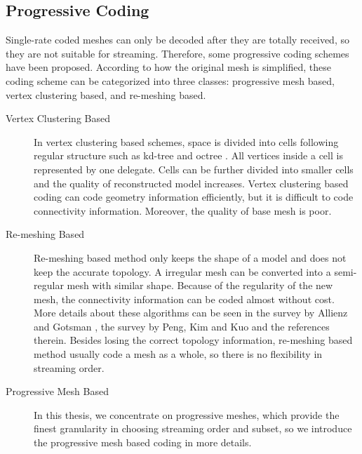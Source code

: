 \documentclass[11pt, a4paper]{report}
\begin{document}
    \subsection{Progressive Coding}
    Single-rate coded meshes can only be decoded after they are
    totally received, so they are not suitable for streaming. Therefore,
    some progressive coding schemes have been proposed. According to
    how the original mesh is simplified, these coding scheme can be
    categorized into three classes: progressive mesh based, vertex
    clustering based, and re-meshing based.
    
    \begin{description}
        \item[Vertex Clustering Based] 
            In vertex clustering based schemes, space is divided into cells
            following regular structure such as kd-tree \cite{566591} and 
            octree \cite{1073237}. All vertices inside a cell is represented
            by one delegate. Cells can be further divided into smaller cells
            and the quality of reconstructed model increases. Vertex clustering
            based coding can code geometry information efficiently, but it is 
            difficult to code connectivity information. Moreover, the quality
            of base mesh is poor.

        \item[Re-meshing Based]
            Re-meshing based method only keeps the shape of a model
            and does not keep the accurate topology. 
            A irregular mesh can be converted into a semi-regular mesh
            with similar shape. 
            Because of the regularity of the new mesh,
            the connectivity information can be coded almost without cost.
            More details about these algorithms can be seen in the survey by Allienz and Gotsman
            \cite{recent:alliez}, the survey by Peng, Kim and Kuo
            \cite{technologies:peng} and the references therein.
            Besides losing the correct topology information,
            re-meshing based method usually code a mesh as a whole, 
            so there is no flexibility in streaming order.

        \item[Progressive Mesh Based]
            In this thesis, we concentrate on progressive meshes, which provide 
            the finest granularity in choosing streaming order and subset, 
            so we introduce the progressive mesh based coding in more details.
    \end{description}
\end{document}

